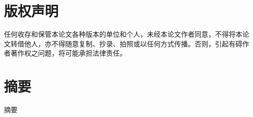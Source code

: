 \documentclass[UTF8,openany,AutoFakeBold,AutoFakeSlant,cs4size]{ctexbook}
\title{}
\author{}
\date{}
\begin{document}
\newcommand{\chineseTitle}{题目第一行}
\newcommand{\chineseTitleSecondLine}{题目第二行}
\newcommand{\englishTitle}{Efficient Global Illumination Method based on}
\newcommand{\englishTitleSecondLine}{Statistical Hypothesis Tests over Samples}
\newcommand{\name}{姓名}
\newcommand{\studentID}{学号}
\newcommand{\school}{学院}
\newcommand{\researchDirection}{专业}
\newcommand{\major}{方向}
\newcommand{\advisor}{XX教授}

\clearpage

% 


\linespread{1.5}\selectfont
\chapter*{版权声明}
\thispagestyle{empty}
任何收存和保管本论文各种版本的单位和个人，未经本论文作者同意，不得将本论文转借他人，亦不得随意复制、抄录、拍照或以任何方式传播。否则，引起有碍作者著作权之问题，将可能承担法律责任。
\clearpage




\pagestyle{fancy}
\normalsize
\linespread{1.5}\selectfont
\chapter*{摘要}
\setcounter{page}{1}

摘要

\vspace*{\fill}



{
	\fancyhf{} %



	\fancyfoot[CO,CE]{~\thepage~}

	\renewcommand{\headrulewidth}{0.7pt} %

	\renewcommand{\footrulewidth}{0pt} %
}
\end{document}
